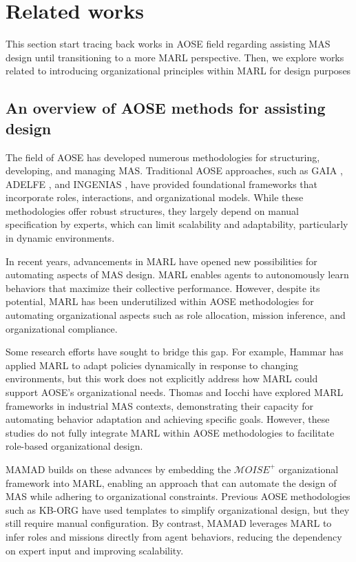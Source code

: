 \documentclass[pdflatex,sn-mathphys-num]{sn-jnl}%
\theoremstyle{thmstyleone}%
\theoremstyle{thmstyletwo}%
\theoremstyle{thmstylethree}%
\begin{document}
\section{Related works}\label{sec:related_works}

This section start tracing back works in AOSE field regarding assisting MAS design until transitioning to a more MARL perspective. Then, we explore works related to introducing organizational principles within MARL for design purposes

\subsection{An overview of AOSE methods for assisting design}

The field of AOSE has developed numerous methodologies for structuring, developing, and managing MAS. Traditional AOSE approaches, such as GAIA \cite{gaia1998}, ADELFE \cite{adelfe2002}, and INGENIAS \cite{ingenias2004}, have provided foundational frameworks that incorporate roles, interactions, and organizational models. While these methodologies offer robust structures, they largely depend on manual specification by experts, which can limit scalability and adaptability, particularly in dynamic environments.

In recent years, advancements in MARL have opened new possibilities for automating aspects of MAS design. MARL enables agents to autonomously learn behaviors that maximize their collective performance. However, despite its potential, MARL has been underutilized within AOSE methodologies for automating organizational aspects such as role allocation, mission inference, and organizational compliance.

Some research efforts have sought to bridge this gap. For example, Hammar \cite{hammar2019} has applied MARL to adapt policies dynamically in response to changing environments, but this work does not explicitly address how MARL could support AOSE's organizational needs. Thomas \cite{thomas2023} and Iocchi \cite{iocchi2023} have explored MARL frameworks in industrial MAS contexts, demonstrating their capacity for automating behavior adaptation and achieving specific goals. However, these studies do not fully integrate MARL within AOSE methodologies to facilitate role-based organizational design.

MAMAD builds on these advances by embedding the $\mathcal{M}OISE^+$ organizational framework into MARL, enabling an approach that can automate the design of MAS while adhering to organizational constraints. Previous AOSE methodologies such as KB-ORG \cite{kborg2001} have used templates to simplify organizational design, but they still require manual configuration. By contrast, MAMAD leverages MARL to infer roles and missions directly from agent behaviors, reducing the dependency on expert input and improving scalability.
\end{document}
